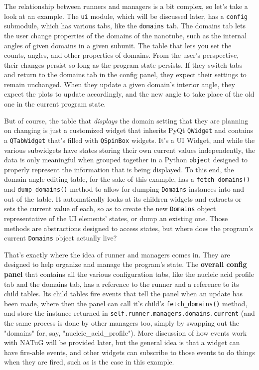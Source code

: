 \documentclass[titlepage]{article}
\begin{document}
	The relationship between runners and managers is a bit complex, so let's take a look at an example. The \texttt{ui} module, which will be discussed later, has a \texttt{config} submodule, which has various tabs, like the \texttt{domains} tab. The domains tab lets the user change properties of the domains of the nanotube, such as the internal angles of given domains in a given subunit. The table that lets you set the counts, angles, and other properties of domains. From the user's perspective, their changes persist so long as the program state persists. If they switch tabs and return to the domains tab in the config panel, they expect their settings to remain unchanged. When they update a given domain's interior angle, they expect the plots to update accordingly, and the new angle to take place of the old one in the current program state.
	
	But of course, the table that \textit{displays} the domain setting that they are planning on changing is just a customized widget that inherits PyQt \texttt{QWidget} and contains a \texttt{QTabWidget} that's filled with \texttt{QSpinBox} widgets. It's a UI Widget, and while the various subwidgets have states storing their own current values independently, the data is only meaningful when grouped together in a Python \texttt{object} designed to properly represent the information that is being displayed. To this end, the domain angle editing table, for the sake of this example, has a \texttt{fetch\_domains()} and \texttt{dump\_domains()} method to allow for dumping \texttt{Domains} instances into and out of the table. It automatically looks at its children widgets and extracts or sets the current value of each, so as to create the new \texttt{Domains} object representative of the UI elements' states, or dump an existing one. Those methods are abstractions designed to access states, but where does the program's current \texttt{Domains} object actually live? 
	
	That's exactly where the idea of runner and managers comes in. They are designed to help organize and manage the program's state. The \textbf{overall config panel} that contains all the various configuration tabs, like the nucleic acid profile tab and the domains tab, has a reference to the runner and a reference to its child tables. Its child tables fire events that tell the panel when an update has been made, where then the panel can call it's child's \texttt{fetch\_domains()} method, and store the instance returned in \texttt{self.runner.managers.domains.current} (and the same process is done by other managers too, simply by swapping out the "domains" for, say, "nucleic\_acid\_profile"). More discussion of how events work with NATuG will be provided later, but the general idea is that a widget can have fire-able events, and other widgets can subscribe to those events to do things when they are fired, such as is the case in this example.
	
\end{document}
